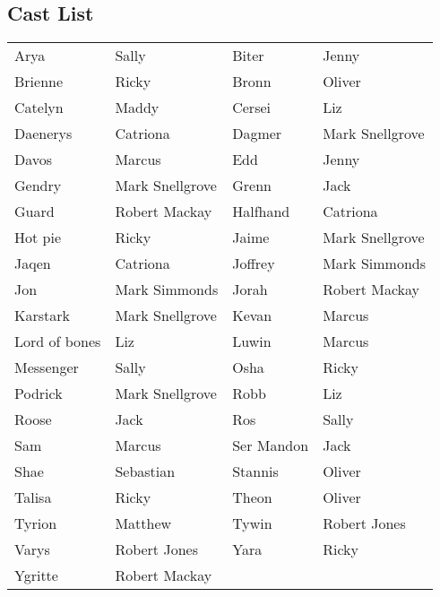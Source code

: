 \subsection*{Cast List}
\begin{tabular}{ll|ll}\\
Arya & Sally &  Biter & Jenny\\
Brienne & Ricky &  Bronn & Oliver\\
Catelyn & Maddy &  Cersei & Liz\\
Daenerys & Catriona &  Dagmer & Mark Snellgrove\\
Davos & Marcus &  Edd & Jenny\\
Gendry & Mark Snellgrove &  Grenn & Jack\\
Guard & Robert Mackay &  Halfhand & Catriona\\
Hot pie & Ricky &  Jaime & Mark Snellgrove\\
Jaqen & Catriona &  Joffrey & Mark Simmonds\\
Jon & Mark Simmonds &  Jorah & Robert Mackay\\
Karstark & Mark Snellgrove &  Kevan & Marcus\\
Lord of bones & Liz &  Luwin & Marcus\\
Messenger & Sally &  Osha & Ricky\\
Podrick & Mark Snellgrove &  Robb & Liz\\
Roose & Jack &  Ros & Sally\\
Sam & Marcus &  Ser Mandon & Jack\\
Shae & Sebastian &  Stannis & Oliver\\
Talisa & Ricky &  Theon & Oliver\\
Tyrion & Matthew &  Tywin & Robert Jones\\
Varys & Robert Jones &  Yara & Ricky\\
Ygritte & Robert Mackay &  \end{tabular}
